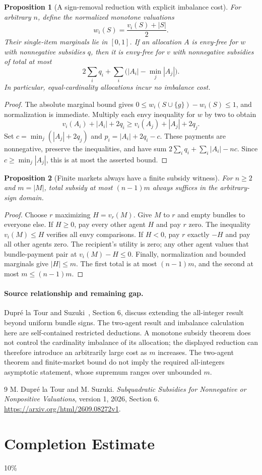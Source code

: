 \documentclass[11pt]{article}
\newtheorem{proposition}{Proposition}
\theoremstyle{definition}
\theoremstyle{remark}
\begin{document}
\begin{proposition}[A sign-removal reduction with explicit imbalance cost]
For arbitrary $n$, define the normalized monotone valuations
\[
 w_i(S)=\frac{v_i(S)+|S|}{2}.
\]
Their single-item marginals lie in $[0,1]$. If an allocation $A$ is envy-free for $w$ with nonnegative subsidies $q$, then it is envy-free for $v$ with nonnegative subsidies of total at most
\[
 2\sum_i q_i+\sum_i\bigl(|A_i|-\min_j|A_j|\bigr).
\]
In particular, equal-cardinality allocations incur no imbalance cost.
\end{proposition}
\begin{proof}
The absolute marginal bound gives $0\leq w_i(S\cup\{g\})-w_i(S)\leq1$, and normalization is immediate. Multiply each envy inequality for $w$ by two to obtain
\[
 v_i(A_i)+|A_i|+2q_i\geq v_i(A_j)+|A_j|+2q_j.
\]
Set $c=\min_j(|A_j|+2q_j)$ and $p_i=|A_i|+2q_i-c$. These payments are nonnegative, preserve the inequalities, and have sum $2\sum_iq_i+\sum_i|A_i|-nc$. Since $c\geq\min_j|A_j|$, this is at most the asserted bound.
\end{proof}

\begin{proposition}[Finite markets always have a finite subsidy witness]
For $n\geq2$ and $m=|M|$, total subsidy at most $(n-1)m$ always suffices in the arbitrary-sign domain.
\end{proposition}
\begin{proof}
Choose $r$ maximizing $H=v_r(M)$. Give $M$ to $r$ and empty bundles to everyone else. If $H\geq0$, pay every other agent $H$ and pay $r$ zero. The inequality $v_i(M)\leq H$ verifies all envy comparisons. If $H<0$, pay $r$ exactly $-H$ and pay all other agents zero. The recipient's utility is zero; any other agent values that bundle-payment pair at $v_i(M)-H\leq0$. Finally, normalization and bounded marginals give $|H|\leq m$. The first total is at most $(n-1)m$, and the second at most $m\leq(n-1)m$.
\end{proof}

\paragraph{Source relationship and remaining gap.}
Dupr\'e la Tour and Suzuki~\cite{source}, Section 6, discuss extending the all-integer result beyond uniform bundle signs. The two-agent result and imbalance calculation here are self-contained restricted deductions. A monotone subsidy theorem does not control the cardinality imbalance of its allocation; the displayed reduction can therefore introduce an arbitrarily large cost as $m$ increases. The two-agent theorem and finite-market bound do not imply the required all-integers asymptotic statement, whose supremum ranges over unbounded $m$.

\begin{thebibliography}{9}
 M. Dupr\'e la Tour and M. Suzuki.
\emph{Subquadratic Subsidies for Nonnegative or Nonpositive Valuations}, version 1, 2026, Section 6.
\url{https://arxiv.org/html/2609.08272v1}.
\end{thebibliography}

\section{Completion Estimate}
10\%
\end{document}
